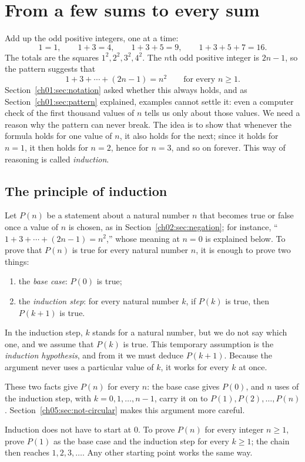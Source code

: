 \section{From a few sums to every sum}\label{ch05:sec:first-induction}
Add up the odd positive integers, one at a time:
\[
1=1,\qquad 1+3=4,\qquad 1+3+5=9,\qquad 1+3+5+7=16.
\]
The totals are the squares $1^2,2^2,3^2,4^2$. The $n$th odd positive integer is $2n-1$, so the pattern suggests that
\[
1+3+\cdots+(2n-1)=n^2\qquad\text{for every } n\ge1.
\]
Section~\ref{ch01:sec:notation} asked whether this always holds, and as Section~\ref{ch01:sec:pattern} explained, examples cannot settle it: even a computer check of the first thousand values of $n$ tells us only about those values. We need a reason why the pattern can never break. The idea is to show that whenever the formula holds for one value of $n$, it also holds for the next; since it holds for $n=1$, it then holds for $n=2$, hence for $n=3$, and so on forever. This way of reasoning is called \emph{induction}.

\subsection*{The principle of induction}
Let $P(n)$ be a statement about a natural number $n$ that becomes true or false once a value of $n$ is chosen, as in Section~\ref{ch02:sec:negation}; for instance, ``$1+3+\cdots+(2n-1)=n^2$,'' whose meaning at $n=0$ is explained below. To prove that $P(n)$ is true for every natural number $n$, it is enough to prove two things:
\begin{enumerate}
\item the \emph{base case}: $P(0)$ is true;
\item the \emph{induction step}: for every natural number $k$, if $P(k)$ is true, then $P(k+1)$ is true.
\end{enumerate}
In the induction step, $k$ stands for a natural number, but we do not say which one, and we assume that $P(k)$ is true. This temporary assumption is the \emph{induction hypothesis}, and from it we must deduce $P(k+1)$. Because the argument never uses a particular value of $k$, it works for every $k$ at once.

These two facts give $P(n)$ for every $n$: the base case gives $P(0)$, and $n$ uses of the induction step, with $k=0,1,\ldots,n-1$, carry it on to $P(1),P(2),\ldots,P(n)$. Section~\ref{ch05:sec:not-circular} makes this argument more careful.

Induction does not have to start at $0$. To prove $P(n)$ for every integer $n\ge1$, prove $P(1)$ as the base case and the induction step for every $k\ge1$; the chain then reaches $1,2,3,\ldots$. Any other starting point works the same way.


